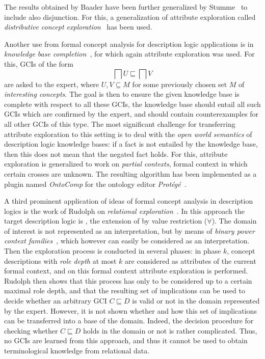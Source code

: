 The results obtained by Baader have been further generalized by
Stumme~\cite{stumme96concept} to include also disjunction.  For this, a generalization of
attribute exploration called \emph{distributive concept
  exploration}~\cite{conf/ki/Stumme98} has been used.

Another use from formal concept analysis for description logic applications is in
\emph{knowledge base completion}~\cite{Sert07,conf/ijcai/BaaderGSS07}, for which again
attribute exploration was used.  For this, GCIs of the form
\begin{equation*}
  \bigsqcap U \sqsubseteq \bigsqcap V
\end{equation*}
are asked to the expert, where $U, V \subseteq M$ for some previously chosen set $M$ of
\emph{interesting concepts}.  The goal is then to ensure the given knowledge base is
complete with respect to all these GCIs, \ie the knowledge base should entail all such
GCIs which are confirmed by the expert, and should contain counterexamples for all other
GCIs of this type.  The most significant challenge for transferring attribute exploration
to this setting is to deal with the \emph{open world semantics} of description logic
knowledge bases: if a fact is not entailed by the knowledge base, then this does not mean
that the negated fact holds.  For this, attribute exploration is generalized to work on
\emph{partial contexts}, \ie formal context in which certain crosses are unknown.  The
resulting algorithm has been implemented as a plugin named \emph{OntoComp} for the
ontology editor \emph{Protégé}~\cite{conf/esws/Sertkaya09}.

A third prominent application of ideas of formal concept analysis in description logics is
the work of Rudolph on \emph{relational
  exploration}~\cite{phd/de/Rudolph2006,conf/iccs/Rudolph04}.  In this approach the target
description logic is \FLE, the extension of \EL by value restriction ($\forall$).  The
domain of interest is not represented as an interpretation, but by means of \emph{binary
  power context families}~\cite{DBLP:conf/iccs/PredigerW99}, which however can easily be
considered as an interpretation.  Then the exploration process is conducted in several
phases: in phase $k$, concept descriptions with \emph{role depth} at most $k$ are
considered as attributes of the current formal context, and on this formal context
attribute exploration is performed.  Rudolph then shows that this process has only to be
considered up to a certain maximal role depth, and that the resulting set of implications
can be used to decide whether an arbitrary GCI $C \sqsubseteq D$ is valid or not in the
domain represented by the expert.  However, it is not shown whether and how this set of
implications can be transferred into a base of the domain.  Indeed, the decision procedure
for checking whether $C \sqsubseteq D$ holds in the domain or not is rather complicated.
Thus, no GCIs are learned from this approach, and thus it cannot be used to obtain
terminological knowledge from relational data.

